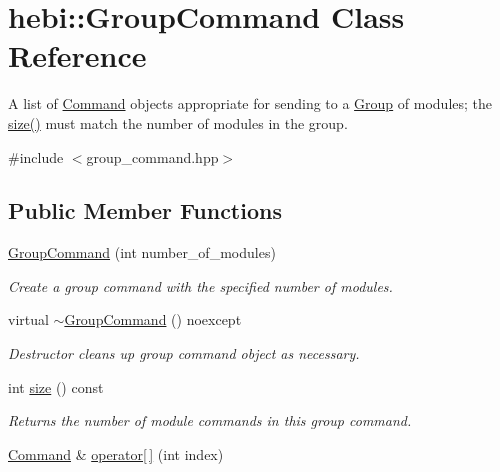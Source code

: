 \hypertarget{classhebi_1_1GroupCommand}{}\section{hebi\+:\+:Group\+Command Class Reference}
\label{classhebi_1_1GroupCommand}


A list of \hyperlink{classhebi_1_1Command}{Command} objects appropriate for sending to a \hyperlink{classhebi_1_1Group}{Group} of modules; the \hyperlink{classhebi_1_1GroupCommand_a171fc503a522b3ab1554c42d373f1f0a}{size()} must match the number of modules in the group.  




{\ttfamily \#include $<$group\+\_\+command.\+hpp$>$}

\subsection*{Public Member Functions}
\begin{DoxyCompactItemize}
\item 
\mbox{\label{classhebi_1_1GroupCommand_a7a41c0aace3d99b0d7e9dcd9b1063a11}} 
\hyperlink{classhebi_1_1GroupCommand_a7a41c0aace3d99b0d7e9dcd9b1063a11}{Group\+Command} (int number\+\_\+of\+\_\+modules)
\begin{DoxyCompactList}\small\item\em Create a group command with the specified number of modules. \end{DoxyCompactList}\item 
\mbox{\label{classhebi_1_1GroupCommand_a382b2ce9d36ab4892a5191407001455c}} 
virtual \hyperlink{classhebi_1_1GroupCommand_a382b2ce9d36ab4892a5191407001455c}{$\sim$\+Group\+Command} () noexcept
\begin{DoxyCompactList}\small\item\em Destructor cleans up group command object as necessary. \end{DoxyCompactList}\item 
\mbox{\label{classhebi_1_1GroupCommand_a171fc503a522b3ab1554c42d373f1f0a}} 
int \hyperlink{classhebi_1_1GroupCommand_a171fc503a522b3ab1554c42d373f1f0a}{size} () const
\begin{DoxyCompactList}\small\item\em Returns the number of module commands in this group command. \end{DoxyCompactList}\item 
\hyperlink{classhebi_1_1Command}{Command} \& \hyperlink{classhebi_1_1GroupCommand_afa9edb2ec0c411b4d9ca701350339a90}{operator\mbox{[}$\,$\mbox{]}} (int index)
\end{DoxyCompactItemize}
